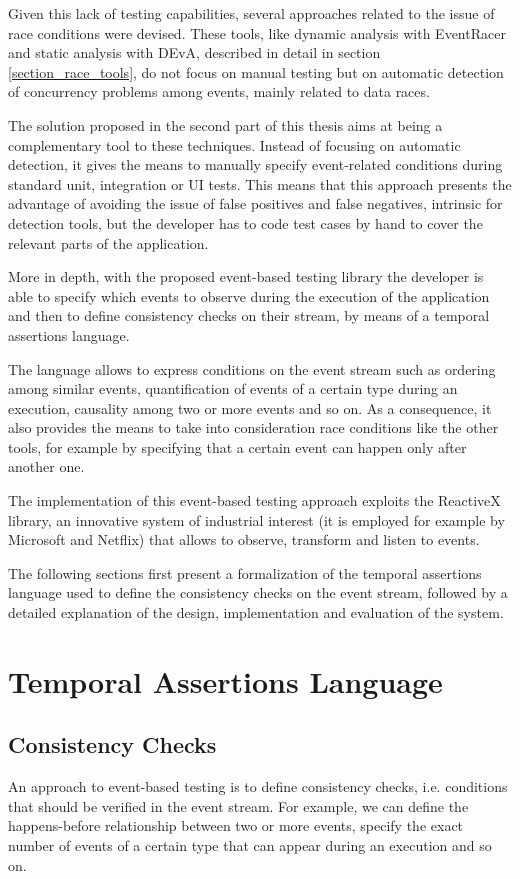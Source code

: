 \documentclass[11pt,a4paper,notitlepage]{article}
\begin{document}
Given this lack of testing capabilities, several approaches related to the issue of race conditions were devised. These tools, like dynamic analysis with EventRacer and static analysis with DEvA, described in detail in section \ref{section_race_tools}, do not focus on manual testing but on automatic detection of concurrency problems among events, mainly related to data races.

The solution proposed in the second part of this thesis aims at being a complementary tool to these techniques. Instead of focusing on automatic detection, it gives the means to manually specify event-related conditions during standard unit, integration or UI tests. This means that this approach presents the advantage of avoiding the issue of false positives and false negatives, intrinsic for detection tools, but the developer has to code test cases by hand to cover the relevant parts of the application.

More in depth, with the proposed event-based testing library the developer is able to specify which events to observe during the execution of the application and then to define consistency checks on their stream, by means of a temporal assertions language.

The language allows to express conditions on the event stream such as ordering among similar events, quantification of events of a certain type during an execution, causality among two or more events and so on. As a consequence, it also provides the means to take into consideration race conditions like the other tools, for example by specifying that a certain event can happen only after another one.

The implementation of this event-based testing approach exploits the ReactiveX library, an innovative system of industrial interest (it is employed for example by Microsoft and Netflix) that allows to observe, transform and listen to events.

The following sections first present a formalization of the temporal assertions language used to define the consistency checks on the event stream, followed by a detailed explanation of the design, implementation and evaluation of the system.

\section{Temporal Assertions Language}

\subsection{Consistency Checks}
An approach to event-based testing is to define consistency checks, i.e. conditions that should be verified in the event stream. For example, we can define the happens-before relationship between two or more events, specify the exact number of events of a certain type that can appear during an execution and so on.
\end{document}

